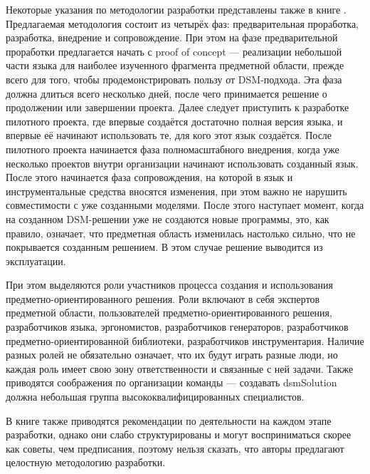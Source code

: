 Некоторые указания по методологии разработки представлены также в книге \cite{kelly2008domain}. 
Предлагаемая методология состоит из четырёх фаз: предварительная проработка, разработка, 
внедрение и сопровождение. При этом на фазе предварительной проработки предлагается начать с
proof of concept --- реализации небольшой части языка для наиболее изученного фрагмента 
предметной области, прежде всего для того, чтобы продемонстрировать пользу от \ac{DSM}-подхода. 
Эта фаза должна длиться всего несколько дней, после чего принимается решение о продолжении 
или завершении проекта. Далее следует приступить к разработке пилотного проекта, где 
впервые создаётся достаточно полная версия языка, и впервые её начинают использовать 
те, для кого этот язык создаётся. После пилотного проекта начинается фаза полномасштабного 
внедрения, когда уже несколько проектов внутри организации начинают использовать созданный 
язык. После этого начинается фаза сопровождения, на которой в язык и инструментальные 
средства вносятся изменения, при этом важно не нарушить совместимости с уже созданными 
моделями. После этого наступает момент, когда на созданном \ac{DSM}-решении уже не создаются 
новые программы, это, как правило, означает, что предметная область изменилась настолько 
сильно, что не покрывается созданным решением. В этом случае решение выводится из эксплуатации.

При этом выделяются роли участников процесса создания и использования предметно-ориентированного 
решения. Роли включают в себя экспертов предметной области, пользователей предметно-ориентированного 
решения, разработчиков языка, эргономистов, разработчиков генераторов, разработчиков 
предметно-ориентированной библиотеки, разработчиков инструментария. Наличие разных 
ролей не обязательно означает, что их будут играть разные люди, но каждая роль имеет свою зону 
ответственности и связанные с ней задачи. Также приводятся соображения по организации команды 
--- создавать \ac{dsmSolution} должна небольшая группа высококвалифицированных специалистов.

В книге также приводятся рекомендации по деятельности на каждом этапе разработки, однако 
они слабо структурированы и могут восприниматься скорее как советы, чем предписания, 
поэтому нельзя сказать, что авторы предлагают целостную методологию разработки.

